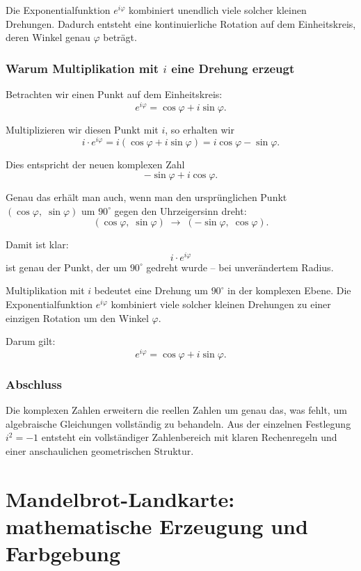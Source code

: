 Die Exponentialfunktion $e^{i\varphi}$ kombiniert unendlich viele solcher
kleinen Drehungen. Dadurch entsteht eine kontinuierliche Rotation auf dem
Einheitskreis, deren Winkel genau $\varphi$ beträgt.

\subsubsection*{Warum Multiplikation mit \boldmath$i$ eine Drehung erzeugt}

Betrachten wir einen Punkt auf dem Einheitskreis:
\[
e^{i\varphi} = \cos\varphi + i\sin\varphi.
\]

Multiplizieren wir diesen Punkt mit $i$, so erhalten wir
\[
i \cdot e^{i\varphi}
= i(\cos\varphi + i\sin\varphi)
= i\cos\varphi - \sin\varphi.
\]

Dies entspricht der neuen komplexen Zahl
\[
-\sin\varphi + i\cos\varphi.
\]

Genau das erhält man auch, wenn man den ursprünglichen Punkt
\((\cos\varphi,\;\sin\varphi)\)
um \(90^\circ\) gegen den Uhrzeigersinn dreht:
\[
(\cos\varphi,\;\sin\varphi)
\;\longrightarrow\;
(-\sin\varphi,\;\cos\varphi).
\]

Damit ist klar:
\[
i \cdot e^{i\varphi}
\]
ist genau der Punkt, der um \(90^\circ\) gedreht wurde -- bei unverändertem Radius.

\begin{DidacticBox}
	\label{box:euler-kernidee}
	Multiplikation mit $i$ bedeutet eine Drehung um $90^\circ$ in der komplexen Ebene.
	Die Exponentialfunktion $e^{i\varphi}$ kombiniert viele solcher kleinen Drehungen
	zu einer einzigen Rotation um den Winkel $\varphi$.
	
	Darum gilt:
	\[
	e^{i\varphi} = \cos\varphi + i\sin\varphi.
	\]
\end{DidacticBox}

\subsubsection*{Abschluss}

Die komplexen Zahlen erweitern die reellen Zahlen um genau das,
was fehlt, um algebraische Gleichungen vollständig zu behandeln.
Aus der einzelnen Festlegung $i^2=-1$ entsteht ein vollständiger Zahlenbereich
mit klaren Rechenregeln und einer anschaulichen geometrischen Struktur.

\section{Mandelbrot-Landkarte: mathematische Erzeugung und Farbgebung}
\label{app:mandelbrot-rendering}


